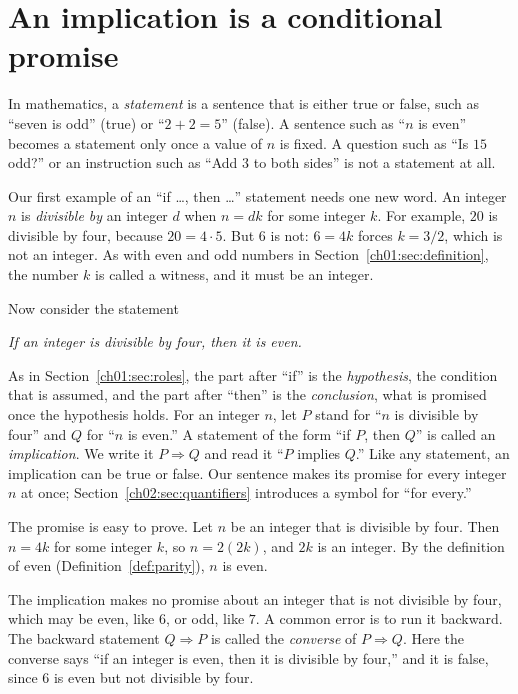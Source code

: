 \section{An implication is a conditional promise}\label{ch02:sec:implication}
In mathematics, a \emph{statement} is a sentence that is either true or false, such as ``seven is odd'' (true) or ``$2+2=5$'' (false). A sentence such as ``$n$ is even'' becomes a statement only once a value of $n$ is fixed. A question such as ``Is $15$ odd?'' or an instruction such as ``Add $3$ to both sides'' is not a statement at all.

Our first example of an ``if \ldots, then \ldots'' statement needs one new word. An integer $n$ is \emph{divisible by} an integer $d$ when $n=dk$ for some integer $k$. For example, $20$ is divisible by four, because $20=4\cdot5$. But $6$ is not: $6=4k$ forces $k=3/2$, which is not an integer. As with even and odd numbers in Section~\ref{ch01:sec:definition}, the number $k$ is called a witness, and it must be an integer.

Now consider the statement
\begin{center}
\emph{If an integer is divisible by four, then it is even.}
\end{center}
As in Section~\ref{ch01:sec:roles}, the part after ``if'' is the \emph{hypothesis}, the condition that is assumed, and the part after ``then'' is the \emph{conclusion}, what is promised once the hypothesis holds. For an integer $n$, let $P$ stand for ``$n$ is divisible by four'' and $Q$ for ``$n$ is even.'' A statement of the form ``if $P$, then $Q$'' is called an \emph{implication}. We write it $P\Rightarrow Q$ and read it ``$P$ implies $Q$.'' Like any statement, an implication can be true or false. Our sentence makes its promise for every integer $n$ at once; Section~\ref{ch02:sec:quantifiers} introduces a symbol for ``for every.''

The promise is easy to prove. Let $n$ be an integer that is divisible by four. Then $n=4k$ for some integer $k$, so $n=2(2k)$, and $2k$ is an integer. By the definition of even (Definition~\ref{def:parity}), $n$ is even.

The implication makes no promise about an integer that is not divisible by four, which may be even, like $6$, or odd, like $7$. A common error is to run it backward. The backward statement $Q\Rightarrow P$ is called the \emph{converse} of $P\Rightarrow Q$. Here the converse says ``if an integer is even, then it is divisible by four,'' and it is false, since $6$ is even but not divisible by four.

